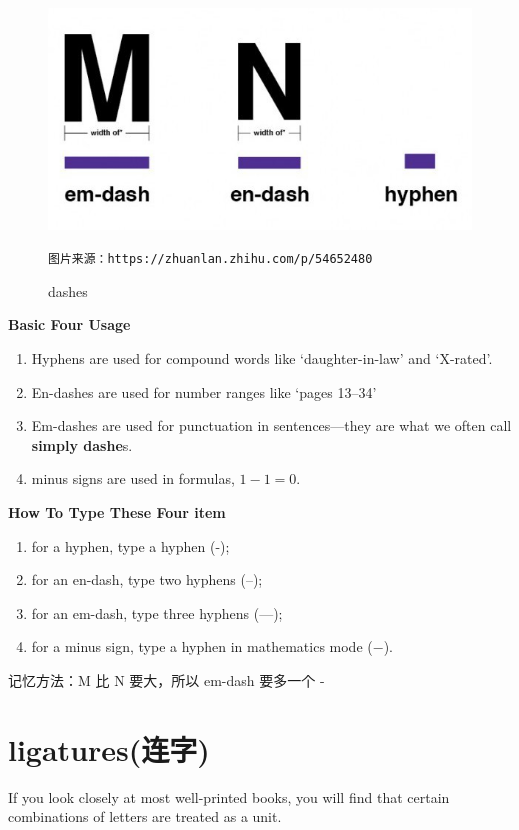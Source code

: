\documentclass[fontset=windows, 12pt]{article}
\begin{document}
    \begin{figure}[!htb]
        \centering  
        \includegraphics[scale=0.5]{./Pic/dash.jpg}
        \label{dash}
        \caption{dashes}
        \verb |图片来源：https://zhuanlan.zhihu.com/p/54652480|
    \end{figure}

\textbf{Basic Four Usage}
\begin{enumerate}
    \item Hyphens are used for compound words like ‘daughter-in-law’ and ‘X-rated’.
    \item En-dashes are used for number ranges like `pages 13--34'
    \item Em-dashes are used for punctuation in sentences---they are
    what we often call {\bf simply dashe}s.
    \item minus signs are used in formulas, $1-1=0$.
\end{enumerate}


\textbf{How To Type These Four item}
\begin{enumerate}
    \item for a hyphen, type a hyphen (-);
    \item for an en-dash, type two hyphens (--);
    \item for an em-dash, type three hyphens (---);
    \item for a minus sign, type a hyphen in mathematics mode ($-$).
\end{enumerate}

记忆方法：M 比 N 要大，所以 em-dash 要多一个 -


\section{ligatures(连字)}
If you look closely at most well-printed books, you will find that certain
combinations of letters are treated as a unit.
\end{document}
